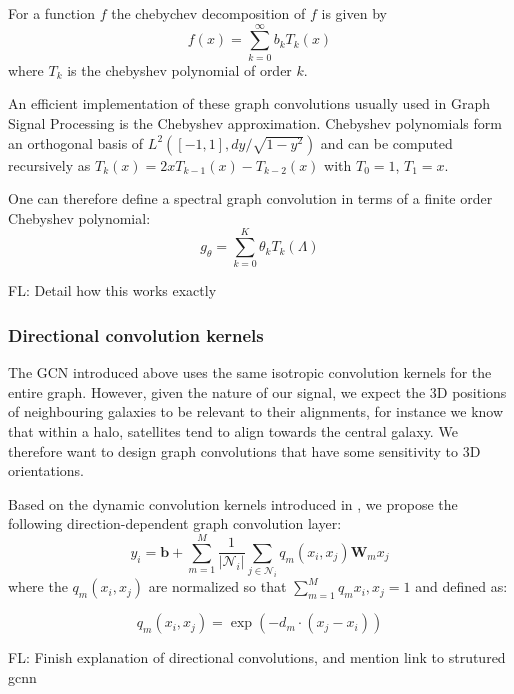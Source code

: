 \documentclass[a4paper,fleqn,usenatbib]{mnras}
\newcommand{\fl}[1]{{\color{magenta}FL: #1}}
\begin{document}
For a function $f$ the chebychev decomposition of $f$ is given by 
\begin{equation}
	f(x) = \sum\limits_{k=0}^{\infty} b_{k} T_k(x)
\end{equation}
where $T_k$ is the  chebyshev polynomial of order $k$.

An efficient implementation of these graph convolutions usually used in Graph Signal Processing is the Chebyshev approximation. Chebyshev polynomials form an orthogonal basis of $L^2([-1,1], dy/\sqrt{1 - y^2})$ and can be computed recursively as $T_k(x) = 2x T_{k-1}(x) - T_{k-2}(x)$ with $T_0 =1$, $T_1 = x$.  

One can therefore define a spectral graph convolution in terms of a finite order Chebyshev polynomial:
\begin{equation}
	g_\theta = \sum_{k=0}^K \theta_k T_k(\Lambda)
\end{equation}

\fl{Detail how this works exactly}

\subsubsection{Directional convolution kernels}

The GCN introduced above uses the same isotropic convolution kernels for the entire graph. However, given the  nature of our signal, we expect the 3D positions of neighbouring galaxies to be relevant to their alignments, for instance we know that within a halo, satellites tend to align towards the central galaxy. We therefore want to design graph convolutions that have some sensitivity to 3D orientations. 

Based on the dynamic convolution kernels introduced in \cite{dynamic}, we propose the following direction-dependent graph convolution layer:
\begin{equation}
	y_i=  \mathbf{b} +  \sum\limits_{m=1}^{M} \frac{1}{|\mathcal{N}_i|} \sum_{j \in \mathcal{N}_i} q_m(x_i, x_j) \mathbf{W}_m x_j 
\end{equation}
where the  $q_m(x_i, x_j)$ are normalized so that $\sum_{m=1}^{M} q_m{x_i, x_j} = 1$ and defined as:

\begin{equation}
		q_m(x_i, x_j) = \exp(- d_m \cdot (x_j - x_i))
\end{equation}

\fl{Finish explanation of directional convolutions, and mention link to strutured gcnn}
\end{document}
